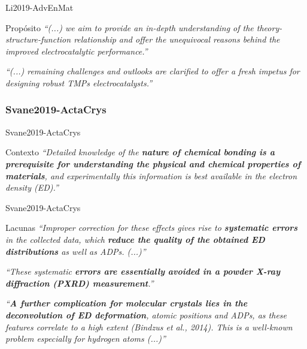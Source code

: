 \begin{frame}{Li2019-AdvEnMat} 
\begin{block}{Propósito}
\emph{``(...) we aim to provide an in-depth understanding of the theory-structure-function relationship and offer the unequivocal reasons behind the improved electrocatalytic performance.''}

\emph{``(...) remaining challenges and outlooks are clarified to offer a fresh impetus for designing robust TMPs electrocatalysts.''}
\end{block}
\end{frame}

\subsubsection*{Svane2019-ActaCrys}

\begin{frame}{Svane2019-ActaCrys} 
\begin{block}{Contexto}
\emph{``Detailed knowledge of the \textbf{nature of chemical bonding is a prerequisite for understanding the physical and chemical properties of materials}, and experimentally this information is best available in the electron density (ED).''}
\end{block}
\end{frame}

\begin{frame}{Svane2019-ActaCrys} 
\begin{block}{Lacunas}
\emph{``Improper correction for these effects gives rise to \textbf{systematic errors} in the collected data, which \textbf{reduce the quality of the obtained ED distributions} as well as ADPs. (...)''}

\emph{``These systematic \textbf{errors are essentially avoided in a powder X-ray diffraction (PXRD) measurement}.''}

\emph{``\textbf{A further complication for molecular crystals lies in the deconvolution of ED deformation}, atomic positions and ADPs, as these features correlate to a high extent (Bindzus et al., 2014). This is a well-known problem especially for hydrogen atoms (...)''}
\end{block}
\end{frame}

